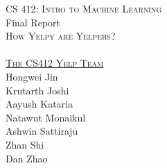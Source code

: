 \begin{titlepage}
\begin{center}

\quad\vspace{5em}


\textsc{\Large CS 412: Intro to Machine Learning}\\
Final Report\\[2cm]

\textsc{\Huge How Yelpy are Yelpers?}\\[1cm]

\\[1cm]

\underline{\textsc{\Large The CS412 Yelp Team}}\\
Hongwei Jin\\Krutarth Joshi\\Aayush Kataria\\
Natawut Monaikul\\Ashwin Sattiraju\\Zhan Shi\\Dan Zhao\\[1cm]
\begin{comment}
\textsc{\Large Hongwei Jin}\\
\textsc{\Large Krutarth Joshi}\\
\textsc{\Large Aayush Kataria}\\
\textsc{\Large Natawut Monaikul}\\
\textsc{\Large Ashwin Sattiraju}\\
\textsc{\Large Zhan Shi}\\
\textsc{\Large Dan Zhao}\\
\end{comment}


\vfill



\end{center}
\end{titlepage}